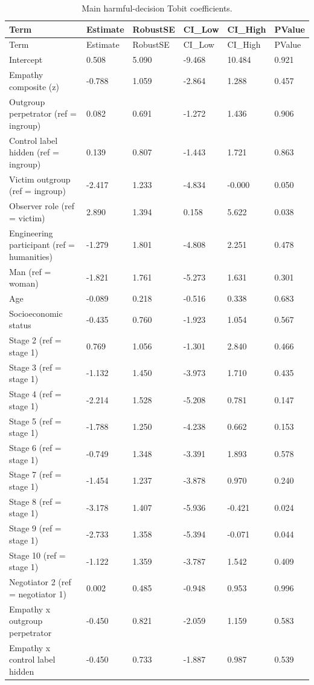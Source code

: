 \documentclass[11pt]{article}
\begin{document}
\begin{longtable}{llllll}
\caption{Main harmful-decision Tobit coefficients.}\label{tab:main_tobit}\\
\toprule
Term & Estimate & RobustSE & CI\_Low & CI\_High & PValue \\
\midrule
\endfirsthead
\toprule
Term & Estimate & RobustSE & CI\_Low & CI\_High & PValue \\
\midrule
\endhead
Intercept & 0.508 & 5.090 & -9.468 & 10.484 & 0.921 \\
Empathy composite (z) & -0.788 & 1.059 & -2.864 & 1.288 & 0.457 \\
Outgroup perpetrator (ref = ingroup) & 0.082 & 0.691 & -1.272 & 1.436 & 0.906 \\
Control label hidden (ref = ingroup) & 0.139 & 0.807 & -1.443 & 1.721 & 0.863 \\
Victim outgroup (ref = ingroup) & -2.417 & 1.233 & -4.834 & -0.000 & 0.050 \\
Observer role (ref = victim) & 2.890 & 1.394 & 0.158 & 5.622 & 0.038 \\
Engineering participant (ref = humanities) & -1.279 & 1.801 & -4.808 & 2.251 & 0.478 \\
Man (ref = woman) & -1.821 & 1.761 & -5.273 & 1.631 & 0.301 \\
Age & -0.089 & 0.218 & -0.516 & 0.338 & 0.683 \\
Socioeconomic status & -0.435 & 0.760 & -1.923 & 1.054 & 0.567 \\
Stage 2 (ref = stage 1) & 0.769 & 1.056 & -1.301 & 2.840 & 0.466 \\
Stage 3 (ref = stage 1) & -1.132 & 1.450 & -3.973 & 1.710 & 0.435 \\
Stage 4 (ref = stage 1) & -2.214 & 1.528 & -5.208 & 0.781 & 0.147 \\
Stage 5 (ref = stage 1) & -1.788 & 1.250 & -4.238 & 0.662 & 0.153 \\
Stage 6 (ref = stage 1) & -0.749 & 1.348 & -3.391 & 1.893 & 0.578 \\
Stage 7 (ref = stage 1) & -1.454 & 1.237 & -3.878 & 0.970 & 0.240 \\
Stage 8 (ref = stage 1) & -3.178 & 1.407 & -5.936 & -0.421 & 0.024 \\
Stage 9 (ref = stage 1) & -2.733 & 1.358 & -5.394 & -0.071 & 0.044 \\
Stage 10 (ref = stage 1) & -1.122 & 1.359 & -3.787 & 1.542 & 0.409 \\
Negotiator 2 (ref = negotiator 1) & 0.002 & 0.485 & -0.948 & 0.953 & 0.996 \\
Empathy x outgroup perpetrator & -0.450 & 0.821 & -2.059 & 1.159 & 0.583 \\
Empathy x control label hidden & -0.450 & 0.733 & -1.887 & 0.987 & 0.539 \\
\bottomrule
\end{longtable}
\end{document}
